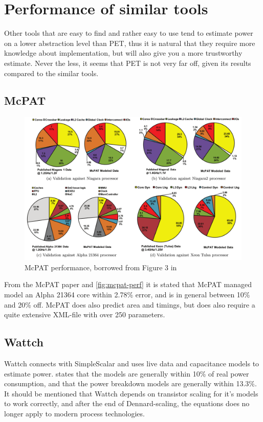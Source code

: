 \section{Performance of similar tools}
Other tools that are easy to find and rather easy to use tend to estimate
power on a lower abstraction level than PET, thus it is natural that they
require more knowledge about implementation, but will also give you a more
trustworthy estimate. Never the less, it seems that PET is not very far off,
given its results compared to the similar tools.

\subsection{McPAT}

\begin{figure}[htb]
\includegraphics[width=\textwidth]{figs/mcpat-performance.png}
\caption{McPAT performance, borrowed from Figure 3 in \cite{li2009mcpat}}
\label{fig:mcpat-perf}
\end{figure}

From the McPAT paper \cite{li2009mcpat} and \autoref{fig:mcpat-perf} it is
stated that McPAT managed model an Alpha 21364 core within 2.78\% error, and is
in general between 10\% and 20\% off. McPAT does also predict area and timings,
but does also require a quite extensive XML-file with over 250 parameters.

\subsection{Wattch}

Wattch connects with SimpleScalar and uses live data and capacitance models to
estimate power. \cite{brooks2000wattch} states that the models are generally
within 10\% of real power consumption, and that the power breakdown models are
generally within 13.3\%. It should be mentioned that Wattch depends on
transistor scaling for it's models to work correctly, and after the end of
Dennard-scaling, the equations does no longer apply to modern process
technologies.


